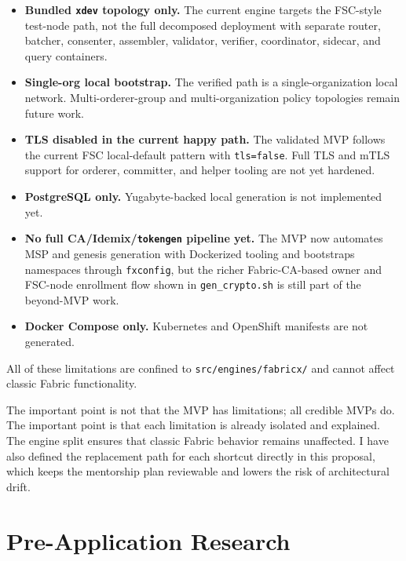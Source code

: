 \begin{tcolorbox}[colback=yellow!5!white, colframe=yellow!60!black,
  title=Known MVP Limitations (all isolated inside the new engine architecture),
  fonttitle=\bfseries, arc=4pt]
\begin{itemize}[leftmargin=*]
\item \textbf{Bundled \texttt{xdev} topology only.} The current engine targets the FSC-style test-node path, not the full decomposed deployment with separate router, batcher, consenter, assembler, validator, verifier, coordinator, sidecar, and query containers.
\item \textbf{Single-org local bootstrap.} The verified path is a single-organization local network. Multi-orderer-group and multi-organization policy topologies remain future work.
\item \textbf{TLS disabled in the current happy path.} The validated MVP follows the current FSC local-default pattern with \texttt{tls=false}. Full TLS and mTLS support for orderer, committer, and helper tooling are not yet hardened.
\item \textbf{PostgreSQL only.} Yugabyte-backed local generation is not implemented yet.
\item \textbf{No full CA/Idemix/\texttt{tokengen} pipeline yet.} The MVP now automates MSP and genesis generation with Dockerized tooling and bootstraps namespaces through \texttt{fxconfig}, but the richer Fabric-CA-based owner and FSC-node enrollment flow shown in \texttt{gen\_crypto.sh} is still part of the beyond-MVP work.
\item \textbf{Docker Compose only.} Kubernetes and OpenShift manifests are not generated.
\end{itemize}
All of these limitations are confined to \texttt{src/engines/fabricx/} and cannot affect classic Fabric functionality.
\end{tcolorbox}

The important point is not that the MVP has limitations; all credible MVPs do. The important point is that each limitation is already isolated and explained. The engine split ensures that classic Fabric behavior remains unaffected. I have also defined the replacement path for each shortcut directly in this proposal, which keeps the mentorship plan reviewable and lowers the risk of architectural drift.

\section{Pre-Application Research}

